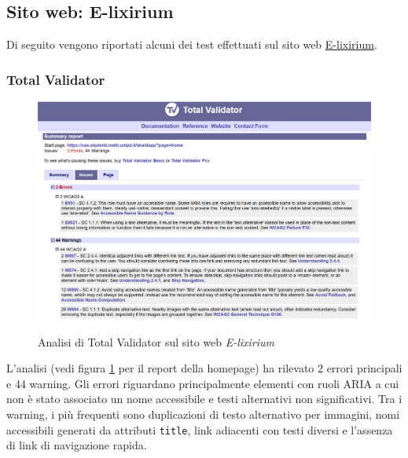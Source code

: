 \vspace{0.5cm}
\subsection{Sito web: E-lixirium}
\noindent Di seguito vengono riportati alcuni dei test effettuati sul sito web \href{https://caa.studenti.math.unipd.it/abaldazz/?page=home}{E-lixirium}.
\subsubsection{Total Validator}
\begin{figure}[H]
    \centering
    \includegraphics[width=0.8\linewidth, alt={Screenshot dell'analisi di Total Validator sul sito web E-lixirium}]{img/TV_elixirium.png}
    \caption{Analisi di Total Validator sul sito web \textit{E-lixirium}}\label{fig:TV_elixirium}
\end{figure}

\noindent L'analisi (vedi figura \ref{fig:TV_elixirium} per il report della homepage) ha rilevato 2 errori principali e 44 warning. 
Gli errori riguardano principalmente elementi con ruoli ARIA a cui non è stato associato un nome accessibile e testi alternativi non significativi. Tra i warning, i più frequenti sono duplicazioni di testo alternativo per immagini, nomi accessibili generati da attributi \texttt{title}, link adiacenti con testi diversi e l’assenza di link di navigazione rapida. 

